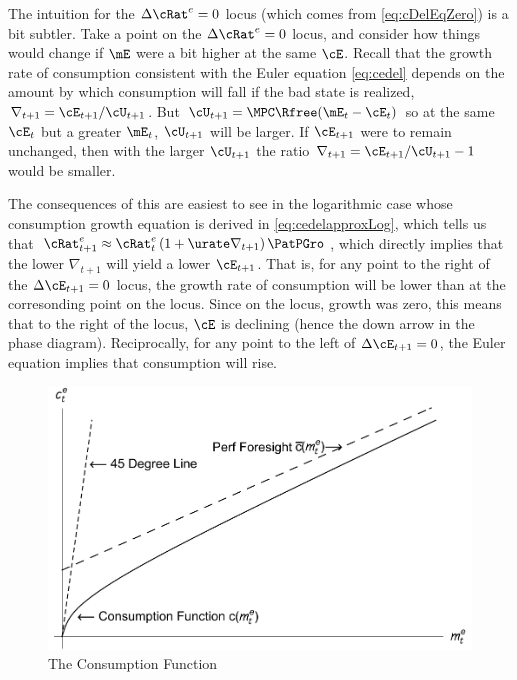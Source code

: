 \documentclass{handout}
\begin{document}

The intuition for the $\Delta {\cRat}^{e}_{\tSS}=0$ locus (which comes from
\eqref{eq:cDelEqZero}) is a bit subtler.  Take a point on 
the $\Delta {\cRat}^{e}_{\tSS}=0$ locus, and consider how things 
would change if $\mE$ were a bit higher at the same $\cE$.  
Recall that the growth rate of consumption consistent with 
the Euler equation \eqref{eq:cedel} depends on the amount by which consumption will
fall if the bad state is realized, $\nabla_{t+1} = \cE_{t+1}/\cU_{t+1}$.  
But $\cU_{t+1} = \MPCU \Rfree (\mE_{t} - \cE_{t})$ so at the same $\cE_{t}$ but 
a greater $\mE_{t}$, $\cU_{t+1}$ will be larger.  If $\cE_{t+1}$ were to remain
unchanged, then with the larger $\cU_{t+1}$ the ratio $\nabla_{t+1} = \cE_{t+1}/\cU_{t+1}-1$ would be smaller.

The consequences of this are easiest to see in the logarithmic case whose consumption growth equation is derived in \eqref{eq:cedelapproxLog}, which tells us that ${\cRat}^{e}_{t+1} \approx {\cRat}^{e}_{t}\left(1+ \urate \nabla _{t+1}\right) {\PatPGro}$, which directly 
implies that the lower $\nabla_{t+1}$ will yield a lower $\cE_{t+1}$.  That is, for any point to the right of the $\Delta \cE_{t+1}=0$ locus, the growth rate of consumption will be lower than at the corresonding point on the locus.  Since on the locus, growth
was zero, this means that to the right of the locus, $\cE$ is declining (hence the down arrow in the phase diagram).  Reciprocally, for any point to the left of $\Delta \cE_{t+1}=0$, the Euler equation implies that consumption will rise.


\begin{figure}
\caption{The Consumption Function}\label{fig:cFunc}
\includegraphics[width=6in]{../Figures/TractableBufferStockcFunc}
\end{figure}
\end{document}
